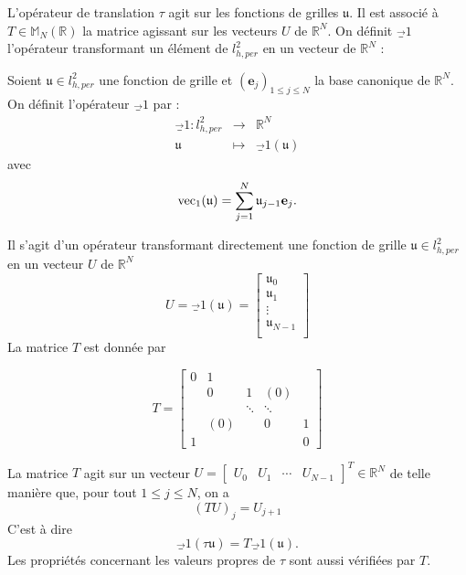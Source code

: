 L'opérateur de translation $\tau$ agit sur les fonctions de grilles $\mathfrak{u}$. Il est associé à $T \in \mathbb{M}_N \left( \mathbb{R} \right)$ la matrice agissant sur les vecteurs $U$ de $\mathbb{R}^N$.
On définit $\vec_1$ l'opérateur transformant un élément de $l_{h,per}^2$ en un vecteur de $\mathbb{R}^N$ :

\begin{definition}
Soient $\mathfrak{u} \in l^2_{h,per}$ une fonction de grille et $(\mathbf{e}_j)_{1 \leq j \leq N}$ la base canonique de $\mathbb{R}^N$. On définit l'opérateur $\vec_1$ par :
\begin{equation}
\begin{array}{rcl}
\vec_1 : l^2_{h,per} & \rightarrow & \mathbb{R}^N\\
         \mathfrak{u} & \mapsto & \vec_1 ( \mathfrak{u} ) 
\end{array}
\end{equation}
avec 
\begin{equation}
\text{vec}_1 ( \mathfrak{u} ) =\displaystyle\sum\limits_{j=1}^N \mathfrak{u}_{j-1} \mathbf{e}_j.
\end{equation}
\end{definition}

Il s'agit d'un opérateur transformant directement une fonction de grille $\mathfrak{u} \in l^2_{h,per}$ en un vecteur $U$ de $\mathbb{R}^N$ 
\begin{equation}
U = \vec_1( \mathfrak{u} ) = \begin{bmatrix}
\mathfrak{u}_0\\
\mathfrak{u}_1\\
\vdots\\
\mathfrak{u}_{N-1}\\
\end{bmatrix}
\end{equation}
La matrice $T$ est donnée par

\begin{equation}
T = \begin{bmatrix}
0 & 1 &   &   &   \\ 
  & 0 & 1 & (0) &   \\ 
  &   & \ddots & \ddots &   \\ 
  & (0) &   & 0 & 1 \\ 
1 &   &   &   & 0
\end{bmatrix} 
\label{eq:matrice_translation}
\end{equation}

La matrice $T$ agit sur un vecteur $U = \begin{bmatrix}
U_0 & U_1 & \cdots & U_{N-1} 
\end{bmatrix}^T \in \mathbb{R}^N $ de telle manière que, pour tout $1 \leq j \leq N$, on a 
\begin{equation}
(TU)_j = U_{j+1}
\end{equation}
C'est à dire
\begin{equation}
\vec_1 ( \tau \mathfrak{u} ) = T \vec_1 ( \mathfrak{u} ). 
\end{equation}
Les propriétés concernant les valeurs propres de $\tau$ sont aussi vérifiées par $T$.

